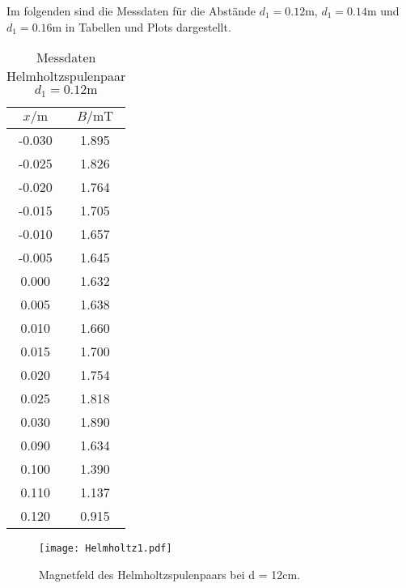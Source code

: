 Im folgenden sind die Messdaten für die Abstände $d_{1} = 0.12\unit\m$, $d_{1} = 0.14\unit\m$ und $d_{1} = 0.16\unit\m$ in Tabellen und Plots dargestellt.

\begin{table}
\centering
\caption{Messdaten Helmholtzspulenpaar $d_{1} = 0.12\unit\m$}
\begin{tabular}{c c}
  \toprule
  $x / \unit\m$ &  $B / \unit{\milli\tesla}$ \\
  \midrule
  -0.030 &        1.895 \\
  -0.025 &        1.826 \\
  -0.020 &        1.764 \\
  -0.015 &        1.705 \\
  -0.010 &        1.657 \\
  -0.005 &        1.645 \\
   0.000 &        1.632 \\
   0.005 &        1.638 \\
   0.010 &        1.660 \\
   0.015 &        1.700 \\
   0.020 &        1.754 \\
   0.025 &        1.818 \\
   0.030 &        1.890 \\
   0.090 &        1.634 \\
   0.100 &        1.390 \\
   0.110 &        1.137 \\
   0.120 &        0.915 \\
  \bottomrule
\end{tabular}
\end{table}

\begin{figure}
  \centering
  \texttt{[image: Helmholtz1.pdf]}
  \caption{Magnetfeld des Helmholtzspulenpaars bei d = 12cm.}
  \label{fig:Helmholtz1}
\end{figure}

